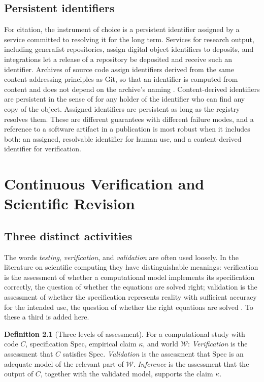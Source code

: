 \documentclass[11pt,twoside,openright]{book}
\theoremstyle{plain}
\theoremstyle{definition}
\newtheorem{definition}[theorem]{Definition}
\theoremstyle{remark}
\begin{document}
\section{Persistent identifiers}

For citation, the instrument of choice is a persistent identifier assigned by a service committed to resolving it for the long term. Services for research output, including generalist repositories, assign digital object identifiers to deposits, and integrations let a release of a repository be deposited and receive such an identifier. Archives of source code assign identifiers derived from the same content-addressing principles as Git, so that an identifier is computed from content and does not depend on the archive's naming \cite{dicosmo2017}. Content-derived identifiers are persistent in the sense of  for any holder of the identifier who can find any copy of the object. Assigned identifiers are persistent as long as the registry resolves them. These are different guarantees with different failure modes, and a reference to a software artifact in a publication is most robust when it includes both: an assigned, resolvable identifier for human use, and a content-derived identifier for verification.

\chapter{Continuous Verification and Scientific Revision}\label{ch:verification}

\section{Three distinct activities}

The words \emph{testing}, \emph{verification}, and \emph{validation} are often used loosely. In the literature on scientific computing they have distinguishable meanings: verification is the assessment of whether a computational model implements its specification correctly, the question of whether the equations are solved right; validation is the assessment of whether the specification represents reality with sufficient accuracy for the intended use, the question of whether the right equations are solved \cite{oberkampf2010}. To these a third is added here.

\begin{definition}[Three levels of assessment]\label{def:threelevels}
For a computational study with code $C$, specification $\mathrm{Spec}$, empirical claim $\kappa$, and world $\mathcal{W}$:
\emph{Verification} is the assessment that $C$ satisfies $\mathrm{Spec}$.
\emph{Validation} is the assessment that $\mathrm{Spec}$ is an adequate model of the relevant part of $\mathcal{W}$.
\emph{Inference} is the assessment that the output of $C$, together with the validated model, supports the claim $\kappa$.
\end{definition}
\end{document}
